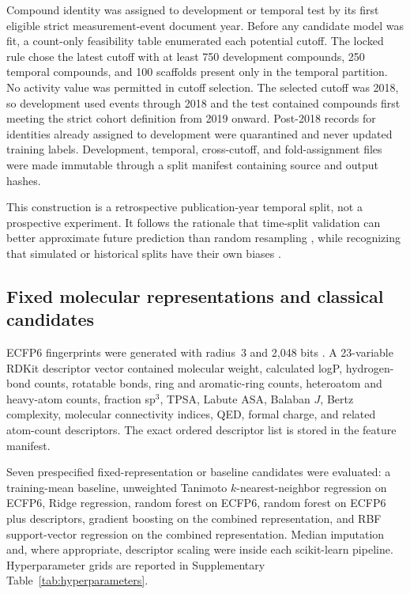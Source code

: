\documentclass[11pt]{article}
\begin{document}
Compound identity was assigned to development or temporal test by its first
eligible strict measurement-event document year. Before any candidate model was
fit, a count-only feasibility table enumerated each potential cutoff. The locked
rule chose the latest cutoff with at least 750 development compounds, 250
temporal compounds, and 100 scaffolds present only in the temporal partition.
No activity value was permitted in cutoff selection. The selected cutoff was
2018, so development used events through 2018 and the test contained compounds
first meeting the strict cohort definition from 2019 onward. Post-2018 records for identities already assigned
to development were quarantined and never updated training labels. Development,
temporal, cross-cutoff, and fold-assignment files were made immutable through a
split manifest containing source and output hashes.

This construction is a retrospective publication-year temporal split, not a
prospective experiment. It follows the rationale that time-split validation can
better approximate future prediction than random resampling
\citep{sheridan2013timesplit}, while recognizing that simulated or historical
splits have their own biases \citep{landrum2023simpd}.

\subsection{Fixed molecular representations and classical candidates}

ECFP6 fingerprints were generated with radius~3 and 2,048 bits
\citep{rogers2010extended}. A 23-variable RDKit descriptor vector contained
molecular weight, calculated logP, hydrogen-bond counts, rotatable bonds, ring and
aromatic-ring counts, heteroatom and heavy-atom counts, fraction sp$^3$, TPSA,
Labute ASA, Balaban $J$, Bertz complexity, molecular connectivity indices, QED,
formal charge, and related atom-count descriptors. The exact ordered descriptor
list is stored in the feature manifest.

Seven prespecified fixed-representation or baseline candidates were evaluated: a training-mean baseline,
unweighted Tanimoto $k$-nearest-neighbor regression on ECFP6, Ridge regression,
random forest on ECFP6, random forest on ECFP6 plus descriptors, gradient boosting
on the combined representation, and RBF support-vector regression on the combined
representation. Median imputation and, where appropriate, descriptor scaling were
inside each scikit-learn pipeline. Hyperparameter grids are reported in
Supplementary Table~\ref{tab:hyperparameters}.
\end{document}

